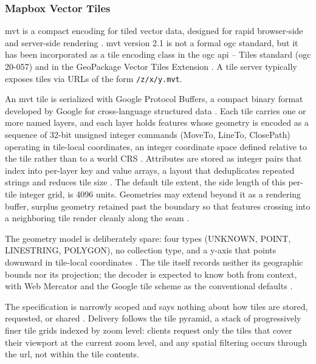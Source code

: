 \subsubsection{Mapbox Vector Tiles}
\label{background:spatial-data-formats-and-storage-models:file-formats:mapbox-vector-tiles}
\acrfull{mvt} is a compact encoding for tiled vector data, designed for rapid browser-side and server-side rendering \parencite{mapbox2017_vector_tile_specification_21}. \acrshort{mvt} version 2.1 is not a formal \acrshort{ogc} standard, but it has been incorporated as a tile encoding class in the \acrshort{ogc} \acrshort{api} -- Tiles standard (\acrshort{ogc} 20-057) \parencite{ogc2022_20057_api_tiles} and in the GeoPackage Vector Tiles Extension \parencite{ogc2018_vector_tiles_pilot_geopackage_extension}. A tile server typically exposes tiles via URLs of the form \texttt{/z/x/y.mvt}.

An \acrshort{mvt} tile is serialized with Google Protocol Buffers, a compact binary format developed by Google for cross-language structured data \parencite{mapbox2017_vector_tile_specification_21}. Each tile carries one or more named layers, and each layer holds features whose geometry is encoded as a sequence of 32-bit unsigned integer commands (MoveTo, LineTo, ClosePath) operating in tile-local coordinates, an integer coordinate space defined relative to the tile rather than to a world CRS \parencite{mapbox2017_vector_tile_specification_21}. Attributes are stored as integer pairs that index into per-layer key and value arrays, a layout that deduplicates repeated strings and reduces tile size \parencite{mapbox2017_vector_tile_specification_21}. The default tile extent, the side length of this per-tile integer grid, is 4096 units. Geometries may extend beyond it as a rendering buffer, surplus geometry retained past the boundary so that features crossing into a neighboring tile render cleanly along the seam \parencite{mapbox2017_vector_tile_specification_21}.

The geometry model is deliberately spare: four types (UNKNOWN, POINT, LINESTRING, POLYGON), no collection type, and a y-axis that points downward in tile-local coordinates \parencite{mapbox2017_vector_tile_specification_21}. The tile itself records neither its geographic bounds nor its projection; the decoder is expected to know both from context, with Web Mercator and the Google tile scheme as the conventional defaults \parencite{mapbox2017_vector_tile_specification_21}.

The specification is narrowly scoped and says nothing about how tiles are stored, requested, or shared \parencite{mapbox2017_vector_tile_specification_21}. Delivery follows the tile pyramid, a stack of progressively finer tile grids indexed by zoom level: clients request only the tiles that cover their viewport at the current zoom level, and any spatial filtering occurs through the \acrshort{url}, not within the tile contents.

